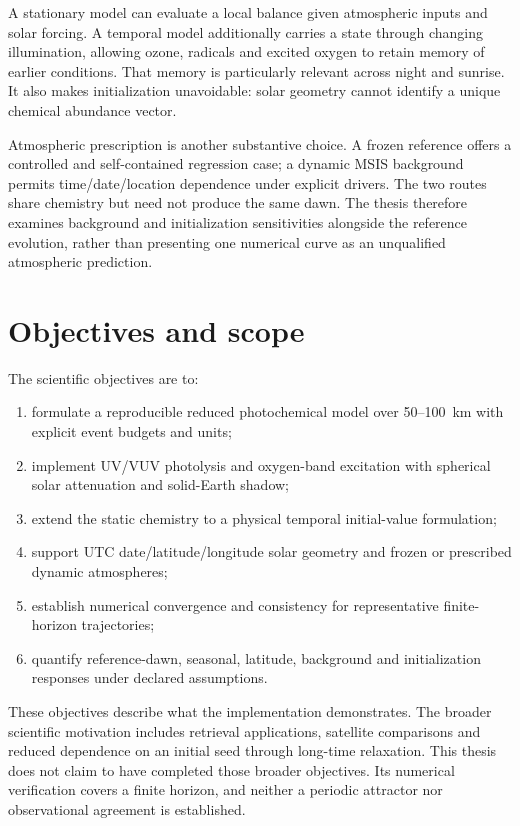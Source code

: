 A stationary model can evaluate a local balance given atmospheric inputs and solar forcing. A temporal model additionally carries a state through changing illumination, allowing ozone, radicals and excited oxygen to retain memory of earlier conditions. That memory is particularly relevant across night and sunrise. It also makes initialization unavoidable: solar geometry cannot identify a unique chemical abundance vector.

Atmospheric prescription is another substantive choice. A frozen reference offers a controlled and self-contained regression case; a dynamic MSIS background permits time/date/location dependence under explicit drivers. The two routes share chemistry but need not produce the same dawn. The thesis therefore examines background and initialization sensitivities alongside the reference evolution, rather than presenting one numerical curve as an unqualified atmospheric prediction.

\section{Objectives and scope}
The scientific objectives are to:
\begin{enumerate}
\item formulate a reproducible reduced photochemical model over 50--100~km with explicit event budgets and units;
\item implement UV/VUV photolysis and oxygen-band excitation with spherical solar attenuation and solid-Earth shadow;
\item extend the static chemistry to a physical temporal initial-value formulation;
\item support UTC date/latitude/longitude solar geometry and frozen or prescribed dynamic atmospheres;
\item establish numerical convergence and consistency for representative finite-horizon trajectories;
\item quantify reference-dawn, seasonal, latitude, background and initialization responses under declared assumptions.
\end{enumerate}
These objectives describe what the implementation demonstrates. The broader scientific motivation includes retrieval applications, satellite comparisons and reduced dependence on an initial seed through long-time relaxation. This thesis does not claim to have completed those broader objectives. Its numerical verification covers a finite horizon, and neither a periodic attractor nor observational agreement is established.

